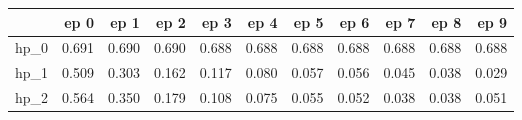 \begin{tabular}{lrrrrrrrrrr}
\toprule
{} &   ep 0 &   ep 1 &   ep 2 &   ep 3 &   ep 4 &   ep 5 &   ep 6 &   ep 7 &   ep 8 &   ep 9 \\
\midrule
hp\_0 &  0.691 &  0.690 &  0.690 &  0.688 &  0.688 &  0.688 &  0.688 &  0.688 &  0.688 &  0.688 \\
hp\_1 &  0.509 &  0.303 &  0.162 &  0.117 &  0.080 &  0.057 &  0.056 &  0.045 &  0.038 &  0.029 \\
hp\_2 &  0.564 &  0.350 &  0.179 &  0.108 &  0.075 &  0.055 &  0.052 &  0.038 &  0.038 &  0.051 \\
\bottomrule
\end{tabular}
